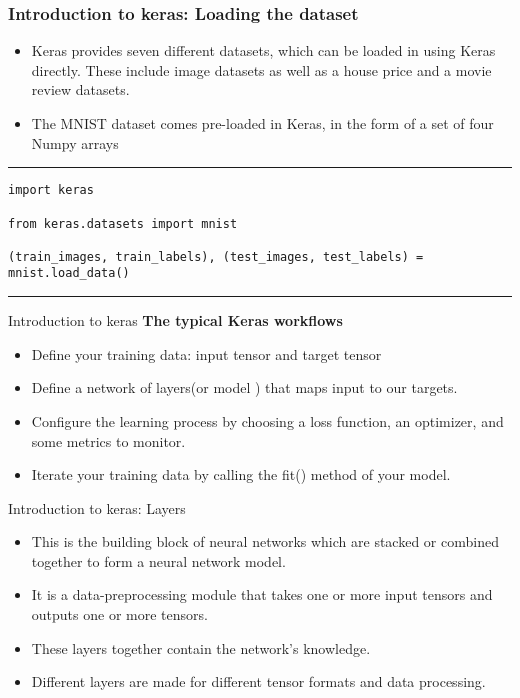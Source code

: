 \documentclass[11pt]{beamer}
\begin{document}
\begin{frame}[fragile]
\frametitle{Introduction to keras: Loading the dataset}
\begin{itemize}
\item Keras provides seven different datasets, which can be loaded in using Keras directly. These include image datasets as well as a house price and a movie review datasets.
\item The MNIST dataset comes pre-loaded in Keras, in the form of a set of four Numpy arrays
\end{itemize}
\rule{\textwidth}{1pt}
\scriptsize
\begin{verbatim}
import keras

from keras.datasets import mnist

(train_images, train_labels), (test_images, test_labels) = mnist.load_data()

\end{verbatim}
\rule{\textwidth}{1pt}
\end{frame}
\begin{frame}{Introduction to keras}
\textbf{The typical Keras workflows}
\vspace{0.5cm}
	\begin{itemize}
		\item Define your training data: input tensor and target tensor
		\item Define a network of layers(or model ) that maps input to our targets.
		\item Configure the learning process by choosing a loss function, an optimizer, and some metrics to monitor.
		\item Iterate your training data by calling the fit() method of your model.
	\end{itemize}
\end{frame}
\begin{frame}{Introduction to keras: Layers}
	\begin{itemize}
		\item This is the building block of neural networks which are stacked or combined together to form a neural network model.
		\item It is a data-preprocessing module that takes one or more input tensors and outputs one or more tensors. 
		\item These layers together contain the network's knowledge. 
		\item Different layers are made for different tensor formats and data processing.
	\end{itemize}
\end{frame}
\end{document}

